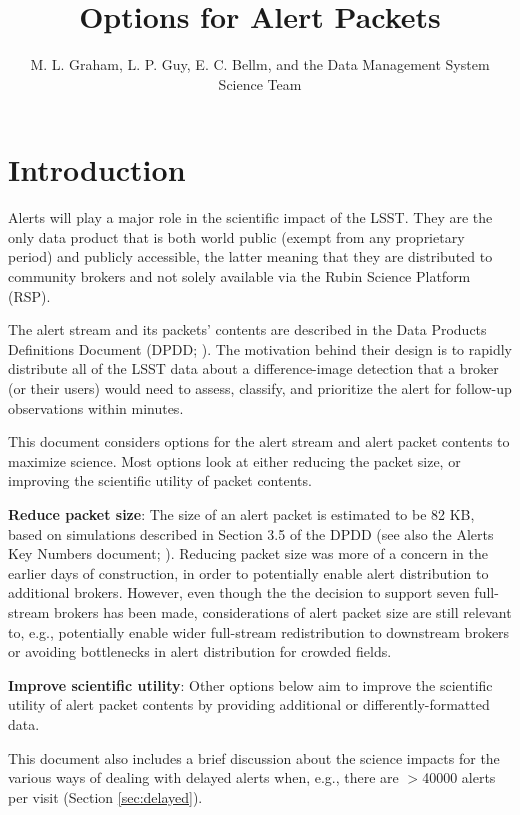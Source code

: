 \documentclass[DM,authoryear,toc]{lsstdoc}
\title{Options for Alert Packets}
\author{%
M. L. Graham, L. P. Guy, E. C. Bellm, and the Data Management System Science Team
}
\date{\vcsDate}
\begin{document}
\maketitle


\section{Introduction}\label{sec:introduction}

Alerts will play a major role in the scientific impact of the LSST.
They are the only data product that is both world public (exempt from any proprietary period) and publicly accessible,
the latter meaning that they are distributed to community brokers and not solely available via the Rubin Science Platform (RSP).

The alert stream and its packets' contents are described in the Data Products Definitions Document (DPDD; ).
The motivation behind their design is to rapidly distribute all of the LSST data about a difference-image detection that a 
broker (or their users) would need to assess, classify, and prioritize the alert for follow-up observations within minutes.

This document considers options for the alert stream and alert packet contents to maximize science.
Most options look at either reducing the packet size, or improving the scientific utility of packet contents.

\textbf{Reduce packet size}:
The size of an alert packet is estimated to be 82 KB, based on simulations described in Section 3.5 of the DPDD 
(see also the Alerts Key Numbers document; ).
Reducing packet size was more of a concern in the earlier days of construction, in order to potentially enable alert 
distribution to additional brokers.
However, even though the the decision to support seven full-stream brokers has been made, considerations of alert packet 
size are still relevant to, e.g., potentially enable wider full-stream redistribution to downstream brokers or avoiding 
bottlenecks in alert distribution for crowded fields.

\textbf{Improve scientific utility}:
Other options below aim to improve the scientific utility of alert packet contents by providing additional or 
differently-formatted data.

This document also includes a brief discussion about the science impacts for the various ways of dealing with 
delayed alerts when, e.g., there are $>$40000 alerts per visit (Section \ref{sec:delayed}).
\end{document}
